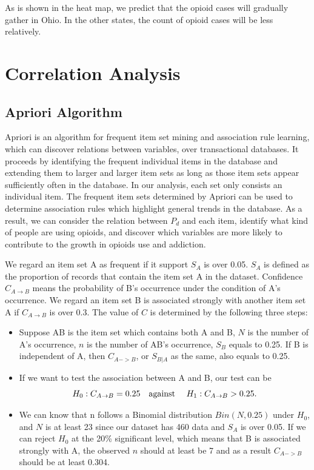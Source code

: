 \documentclass[12pt]{article}
\begin{document}
As is shown in the heat map, we predict that the opioid cases will gradually gather in Ohio. In the other states, the count of opioid cases will be less relatively. 

\section{Correlation Analysis}
\subsection{Apriori Algorithm}
Apriori\cite{Apriori} is an algorithm for frequent item set mining and association rule learning, which can discover relations between variables, over transactional databases. It proceeds by identifying the frequent individual items in the database and extending them to larger and larger item sets as long as those item sets appear sufficiently often in the database. In our analysis, each set only consists an individual item. The frequent item sets determined by Apriori can be used to determine association rules which highlight general trends in the database. As a result, we can consider the relation between $P_d$ and each item, identify what kind of people are using opioids, and discover which variables are more likely to contribute to the growth in opioids use and addiction. 

We regard an item set A as frequent if it support $S_A$ is over 0.05. $S_A$ is defined as the proportion of records that contain the item set A in the dataset. Confidence $C_{A \to B}$ means the probability of B's occurrence under the condition of A's occurrence. We regard an item set B is associated strongly with another item set A if $C_{A \to B}$ is over 0.3. The value of $C$ is determined by the following three steps:
\begin{itemize}
\item Suppose AB is the item set which contains both A and B, $N$ is the number of A's occurrence, $n$ is the number of AB's occurrence, $S_B$ equals to 0.25. If B is independent of A, then $C_{A -> B}$, or $S_{B|A}$ as the same, also equals to 0.25. 
\item If we want to test the association between A and B, our test can be
\[H_0: C_{A \to B} = 0.25 \text{\quad against \quad} H_1: C_{A \to B} > 0.25 \text{.}\]
\item We can know that n follows a Binomial distribution $Bin(N, 0.25)$ under $H_0$, and $N$ is at least 23 since our dataset has 460 data and $S_A$ is over 0.05. If we can reject $H_0$ at the 20\% significant level, which means that B is associated strongly with A, the observed $n$ should at least be 7 and as a result $C_{A -> B}$ should be at least 0.304.
\end{itemize}
\end{document}
